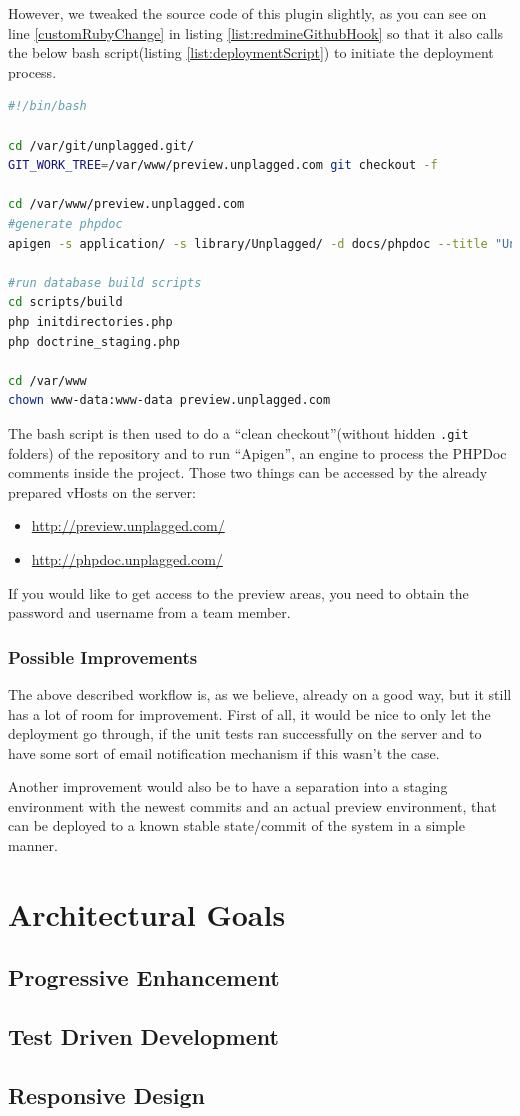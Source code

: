 However, we tweaked the source code of this plugin slightly, as you can see on line \ref{customRubyChange}
in listing \ref{list:redmineGithubHook} so that it also calls the below bash script(listing \ref{list:deploymentScript})
to initiate the deployment process.

\lstset{language=bash}
\begin{lstlisting}[caption=Deployment script, language=bash, label=list:deploymentScript]
#!/bin/bash

cd /var/git/unplagged.git/
GIT_WORK_TREE=/var/www/preview.unplagged.com git checkout -f

cd /var/www/preview.unplagged.com
#generate phpdoc
apigen -s application/ -s library/Unplagged/ -d docs/phpdoc --title "Unplagged Documentation" --todo yes

#run database build scripts
cd scripts/build
php initdirectories.php
php doctrine_staging.php

cd /var/www
chown www-data:www-data preview.unplagged.com
\end{lstlisting}

The bash script is then used to do a \enquote{clean checkout}(without hidden \texttt{.git} folders) of the repository and
to run \enquote{Apigen}, an engine to process the PHPDoc comments inside the project.
Those two things can be accessed by the already prepared vHosts on the server:

\begin{itemize}
\item \url{http://preview.unplagged.com/}
\item \url{http://phpdoc.unplagged.com/}
\end{itemize}

If you would like to get access to the preview areas, you need to obtain the password and username from a team member.

\subsubsection{Possible Improvements}

The above described workflow is, as we believe, already on a good way, but it still has a lot of room for improvement. 
First of all, it would
be nice to only let the deployment go through, if the unit tests ran successfully on the server and to have some sort of 
email notification mechanism if this wasn't the case.

Another improvement would also be to have a separation into a staging environment with the newest commits and an 
actual preview environment, that can be deployed to a known stable state/commit of the system in a simple manner.


\section{Architectural Goals}

\subsection{Progressive Enhancement}

\subsection{Test Driven Development}

\subsection{Responsive Design}